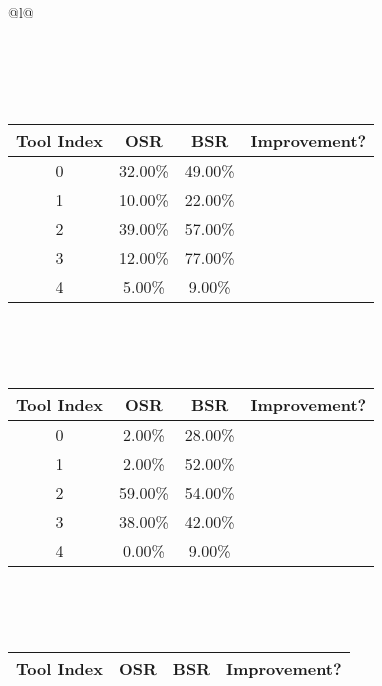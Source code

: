 \begin{longtable}{@{}l@{}}
\begin{minipage}{\textwidth}
\begin{tabular}{|c|c|c|c|}
\end{tabular}
\end{minipage}\\[2ex]
\begin{minipage}{\textwidth}
\centering\vspace{2ex}
\\[0.8ex]
\begin{tabular}{|c|c|c|c|} \hline
\textbf{Tool Index} & \textbf{OSR} & \textbf{ BSR} & \textbf{Improvement?} \\ \hline
0 & 32.00\% & 49.00\% & \textcolor{green}{\ding{51}} \\ \hline
1 & 10.00\% & 22.00\% & \textcolor{green}{\ding{51}} \\ \hline
2 & 39.00\% & 57.00\% & \textcolor{green}{\ding{51}} \\ \hline
3 & 12.00\% & 77.00\% & \textcolor{green}{\ding{51}} \\ \hline
4 & 5.00\% & 9.00\% & \textcolor{green}{\ding{51}} \\ \hline
\end{tabular}
\end{minipage}\\[2ex]
\begin{minipage}{\textwidth}
\centering\vspace{2ex}
\\[0.8ex]
\begin{tabular}{|c|c|c|c|} \hline
\textbf{Tool Index} & \textbf{OSR} & \textbf{ BSR} & \textbf{Improvement?} \\ \hline
0 & 2.00\% & 28.00\% & \textcolor{green}{\ding{51}} \\ \hline
1 & 2.00\% & 52.00\% & \textcolor{green}{\ding{51}} \\ \hline
2 & 59.00\% & 54.00\% & \textcolor{red}{\ding{55}} \\ \hline
3 & 38.00\% & 42.00\% & \textcolor{green}{\ding{51}} \\ \hline
4 & 0.00\% & 9.00\% & \textcolor{green}{\ding{51}} \\ \hline
\end{tabular}
\end{minipage}\\[2ex]
\begin{minipage}{\textwidth}
\centering\vspace{2ex}
\\[0.8ex]
\begin{tabular}{|c|c|c|c|} \hline
\textbf{Tool Index} & \textbf{OSR} & \textbf{ BSR} & \textbf{Improvement?} \\ \hline

\end{tabular}
\end{minipage}
\end{longtable}
